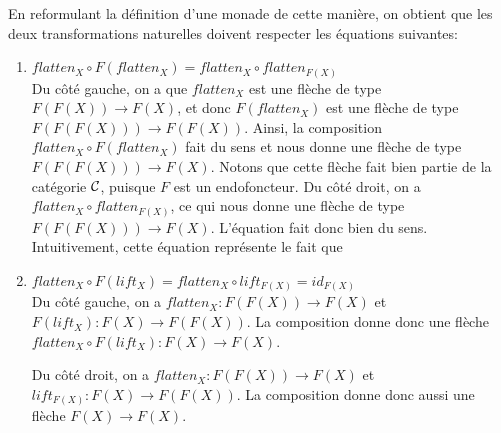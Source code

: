 En reformulant la définition d'une monade de cette manière, on obtient que
les deux transformations naturelles doivent respecter les équations suivantes:
\begin{enumerate}
    \item $flatten_X \circ F(flatten_X) = flatten_X \circ flatten_{F(X)}$\\
    Du côté gauche, on a que $flatten_X$ est une flèche de type $F(F(X)) \to F(X)$,
    et donc $F(flatten_X)$ est une flèche de type $F(F(F(X))) \to F(F(X))$. Ainsi,
    la composition $flatten_X \circ F(flatten_X)$ fait du sens et nous donne une
    flèche de type $F(F(F(X))) \to F(X)$. Notons que cette flèche fait bien
    partie de la catégorie $\mathcal{C}$, puisque $F$ est un endofoncteur. Du côté
    droit, on a $flatten_X \circ flatten_{F(X)}$, ce qui nous donne une flèche
    de type $F(F(F(X))) \to F(X)$. L'équation fait donc bien du sens.
    Intuitivement, cette équation représente le fait que 

    \item $flatten_X \circ F(lift_X) = flatten_X \circ lift_{F(X)} = id_{F(X)}$\\
    Du côté gauche, on a $flatten_X : F(F(X)) \to F(X)$ et
    $F(lift_{X}) : F(X) \to F(F(X))$. La composition donne donc une flèche
    $flatten_X \circ F(lift_X) : F(X) \to F(X)$.

    Du côté droit, on a $flatten_X : F(F(X)) \to F(X)$ et
    $lift_{F(X)} : F(X) \to F(F(X))$. La composition donne donc aussi une
    flèche $F(X) \to F(X)$.
\end{enumerate}

